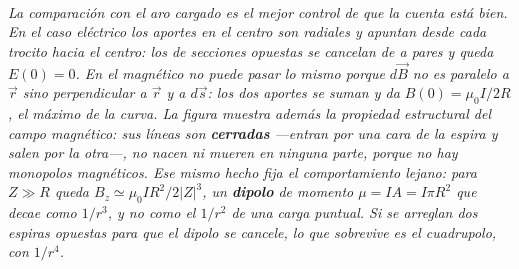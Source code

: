 \begin{center}
\\[0.5em]
{\small\itshape La comparación con el aro cargado es el mejor control de que la
cuenta está bien. En el caso eléctrico los aportes en el centro son radiales y
apuntan desde cada trocito hacia el centro: los de secciones opuestas se
cancelan de a pares y queda $E(0)=0$. En el magnético no puede pasar lo mismo
porque $d\vec B$ no es paralelo a $\vec r$ sino perpendicular a $\vec r$ y a
$d\vec s$: los dos aportes se suman y da $B(0)=\mu_0 I/2R$, el máximo de la
curva. La figura muestra además la propiedad estructural del campo magnético:
sus líneas son \textbf{cerradas} ---entran por una cara de la espira y salen por
la otra---, no nacen ni mueren en ninguna parte, porque no hay monopolos
magnéticos. Ese mismo hecho fija el comportamiento lejano: para $Z\gg R$ queda
$B_z\simeq \mu_0 I R^2/2|Z|^3$, un \textbf{dipolo} de momento $\mu = IA = I\pi
R^2$ que decae como $1/r^3$, y no como el $1/r^2$ de una carga puntual. Si se
arreglan dos espiras opuestas para que el dipolo se cancele, lo que sobrevive es
el cuadrupolo, con $1/r^4$.}
\end{center}
